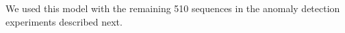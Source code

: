 We used this model with the
remaining 510 sequences in the anomaly detection experiments described
next.

\begin{figure}[t]
    \centering
    \\

\end{figure}
